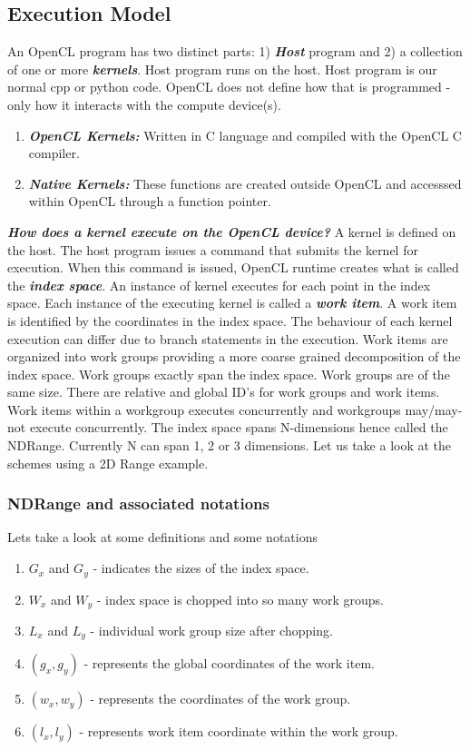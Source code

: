 \subsection{Execution Model}
An OpenCL program has two distinct parts: 1) \textbf{\textit{Host}} program and 2) a collection of one or more \textbf{\textit{kernels}}. Host program runs on the host. Host program is our normal cpp or python code. OpenCL does not define how that is programmed - only how it interacts with the compute device(s).
\begin{enumerate}
	\item \textbf{\textit{OpenCL Kernels:}} Written in C language and compiled with the OpenCL C compiler.
	\item \textbf{\textit{Native Kernels:}} These functions are created outside OpenCL and accesssed within OpenCL through a function pointer.
\end{enumerate}

\textit{\textbf{How does a kernel execute on the OpenCL device?}} A kernel is defined on the host. The host program issues a command that submits the kernel for execution. When this command is issued, OpenCL runtime creates what is called the \textit{\textbf{index space}}. An instance of kernel executes for each point in the index space. Each instance of the executing kernel is called a \textit{\textbf{work item}}. A work item is identified by the coordinates in the index space. The behaviour of each kernel execution can differ due to branch statements in the execution. Work items are organized into work groups providing a more coarse grained decomposition of the index space. Work groups exactly span the index space. Work groups are of the same size. There are relative and global ID's for work groups and work items. Work items within a workgroup executes concurrently and workgroups may/may-not execute concurrently. The index space spans N-dimensions hence called the NDRange. Currently N can span 1, 2 or 3 dimensions. Let us take a look at the schemes using a 2D Range example.

\subsubsection{NDRange and associated notations}
Lets take a look at some definitions and some notations
\begin{enumerate}
	\item $G_x$ and $G_y$ - indicates the sizes of the index space.
	\item $W_x$ and $W_y$ - index space is chopped into so many work groups.
	\item $L_x$ and $L_y$ - individual work group size after chopping.
	\item $(g_x,g_y)$ - represents the global coordinates of the work item.
	\item $(w_x, w_y)$ - represents the coordinates of the work group.
	\item $(l_x,l_y)$ - represents work item coordinate within the work group.
\end{enumerate}

